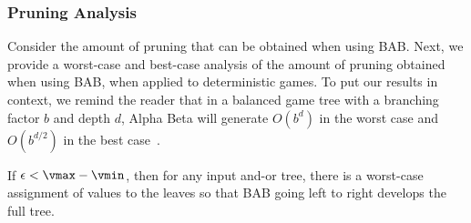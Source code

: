 \subsubsection{Pruning Analysis}


Consider the amount of pruning that can be obtained when using BAB. 
Next, we provide a worst-case and best-case analysis of the amount of pruning obtained when using BAB, when applied to deterministic games. To put our results in context, we remind the reader that in a balanced game tree with a branching factor $b$ and depth $d$, Alpha Beta will generate $O(b^d)$ in the worst case and $O(b^{d/2})$ in the best case~\cite{knuth1975analysis}. 
\begin{theorem}
If $\epsilon < \vmax - \vmin$, then for any input and-or tree, there is a worst-case assignment of values to the leaves so that BAB going left to right develops the full tree.
\label{the:worst}
\end{theorem}

